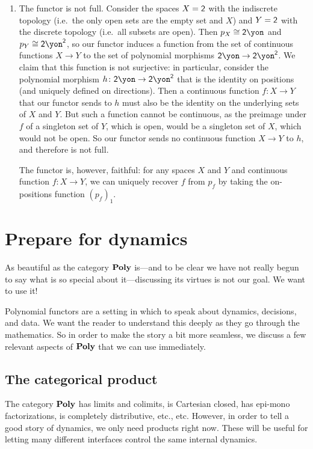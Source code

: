 \documentclass[Book-Poly]{subfiles}
\begin{document}
\begin{exercise}
\begin{solution}
\begin{enumerate}
	\item The functor is not full.
	Consider the spaces $X = \textsf{2}$ with the indiscrete topology (i.e.\ the only open sets are the empty set and $X$) and $Y = \textsf{2}$ with the discrete topology (i.e.\ all subsets are open).
	Then $p_X \iso \2\yon$ and $p_Y \iso \2\yon^\2$, so our functor induces a function from the set of continuous functions $X \to Y$ to the set of polynomial morphisms $\2\yon \to \2\yon^\2$.
	We claim that this function is not surjective: in particular, consider the polynomial morphism $h \colon \2\yon \to \2\yon^\2$ that is the identity on positions (and uniquely defined on directions).
	Then a continuous function $f \colon X \to Y$ that our functor sends to $h$ must also be the identity on the underlying sets of $X$ and $Y$.
	But such a function cannot be continuous, as the preimage under $f$ of a singleton set of $Y$, which is open, would be a singleton set of $X$, which would not be open. 
	So our functor sends no continuous function $X \to Y$ to $h$, and therefore is not full.
	
	The functor is, however, faithful: for any spaces $X$ and $Y$ and continuous function $f \colon X \to Y$, we can uniquely recover $f$ from $p_f$ by taking the on-positions function $(p_f)_1$.
\end{enumerate}
\end{solution}
\end{exercise}

\section{Prepare for dynamics} \label{sec.poly.func_nat.prepare_dyn}

As beautiful as the category $\mathbf{Poly}$ is---and to be clear we have not really begun to say what is so special about it---discussing its virtues is not our goal. We want to use it!

Polynomial functors are a setting in which to speak about dynamics, decisions, and data. We want the reader to understand this deeply as they go through the mathematics. So in order to make the story a bit more seamless, we discuss a few relevant aspects of $\mathbf{Poly}$ that we can use immediately.

\subsection{The categorical product} \label{subsec.poly.func_nat.prepare_dyn.prod}
The category $\mathbf{Poly}$ has limits and colimits, is Cartesian closed, has epi-mono factorizations, is completely distributive, etc., etc. However, in order to tell a good story of dynamics, we only need products right now. These will be useful for letting many different interfaces control the same internal dynamics.
\end{document}
